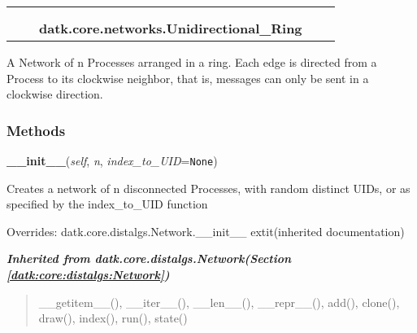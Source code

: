     \label{datk:core:networks:Unidirectional_Ring}
\begin{tabular}{cccccc}
\multicolumn{2}{r}{\settowidth{\BCL}{datk.core.distalgs.Network}\multirow{2}{\BCL}{datk.core.distalgs.Network}}
&&
  \\\cline{3-3}
  &&\multicolumn{1}{c|}{}
&&
  \\
&&\multicolumn{2}{l}{\textbf{datk.core.networks.Unidirectional\_Ring}}
\end{tabular}

A Network of n Processes arranged in a ring. Each edge is directed from a 
Process to its clockwise neighbor, that is, messages can only be sent in a 
clockwise direction.



  \subsubsection{Methods}

    \vspace{0.5ex}

\hspace{.8\funcindent}\begin{boxedminipage}{\funcwidth}

    \raggedright \textbf{\_\_init\_\_}(\textit{self}, \textit{n}, \textit{index\_to\_UID}={\tt None})

\setlength{\parskip}{2ex}
    Creates a network of n disconnected Processes, with random distinct 
    UIDs, or as specified by the index\_to\_UID function

\setlength{\parskip}{1ex}
      Overrides: datk.core.distalgs.Network.\_\_init\_\_ 	extit{(inherited documentation)}

    \end{boxedminipage}


\large{\textbf{\textit{Inherited from datk.core.distalgs.Network\textit{(Section \ref{datk:core:distalgs:Network})}}}}

\begin{quote}
\_\_getitem\_\_(), \_\_iter\_\_(), \_\_len\_\_(), \_\_repr\_\_(), add(), clone(), draw(), index(), run(), state()
\end{quote}

